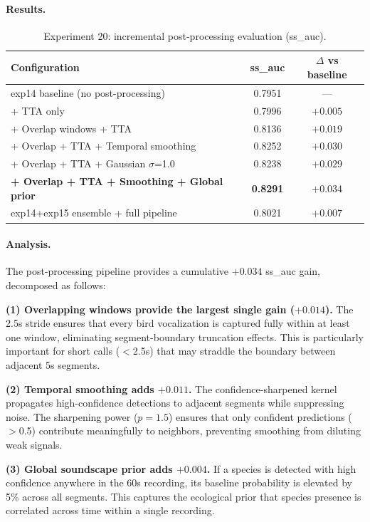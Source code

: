 \paragraph{Results.}
\begin{table}[h]
\centering
\caption{Experiment 20: incremental post-processing evaluation (ss\_auc).}
\label{tab:exp20}
\begin{tabular}{lcc}
\hline
\textbf{Configuration} & \textbf{ss\_auc} & \textbf{$\Delta$ vs baseline} \\
\hline
exp14 baseline (no post-processing) & 0.7951 & --- \\
+ TTA only & 0.7996 & $+0.005$ \\
+ Overlap windows + TTA & 0.8136 & $+0.019$ \\
+ Overlap + TTA + Temporal smoothing & 0.8252 & $+0.030$ \\
+ Overlap + TTA + Gaussian $\sigma$=1.0 & 0.8238 & $+0.029$ \\
\textbf{+ Overlap + TTA + Smoothing + Global prior} & \textbf{0.8291} & $+\mathbf{0.034}$ \\
\hline
exp14+exp15 ensemble + full pipeline & 0.8021 & $+0.007$ \\
\hline
\end{tabular}
\end{table}

\paragraph{Analysis.}
The post-processing pipeline provides a cumulative $+0.034$ ss\_auc gain,
decomposed as follows:

\textbf{(1) Overlapping windows provide the largest single gain ($+0.014$).}
The 2.5s stride ensures that every bird vocalization is captured fully within
at least one window, eliminating segment-boundary truncation effects. This
is particularly important for short calls ($<$2.5s) that may straddle
the boundary between adjacent 5s segments.

\textbf{(2) Temporal smoothing adds $+0.011$.}
The confidence-sharpened kernel propagates high-confidence detections to
adjacent segments while suppressing noise. The sharpening power ($p=1.5$)
ensures that only confident predictions ($>$0.5) contribute meaningfully
to neighbors, preventing smoothing from diluting weak signals.

\textbf{(3) Global soundscape prior adds $+0.004$.}
If a species is detected with high confidence anywhere in the 60s recording,
its baseline probability is elevated by 5\% across all segments. This captures
the ecological prior that species presence is correlated across time within
a single recording.

